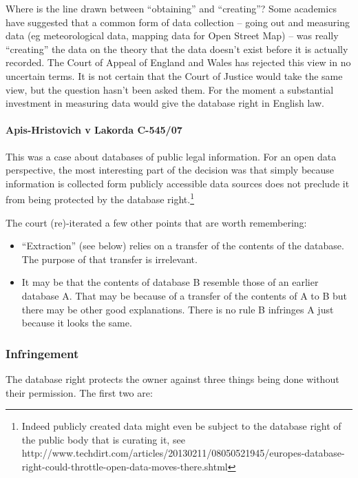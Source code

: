 Where is the line drawn between ``obtaining'' and ``creating''? Some
academics have suggested that a common form of data collection -- going
out and measuring data (eg meteorological data, mapping data for Open
Street Map) -- was really ``creating'' the data on the theory that the
data doesn't exist before it is actually recorded. The Court of Appeal
of England and Wales has rejected this view in no uncertain terms. It is
not certain that the Court of Justice would take the same view, but the
question hasn't been asked them. For the moment a substantial investment
in measuring data would give the database right in English law.

\paragraph{Apis-Hristovich v Lakorda
C-545/07}\label{apis-hristovich-v-lakorda-c-54507}

This was a case about databases of public legal information. For an open
data perspective, the most interesting part of the decision was that
simply because information is collected form publicly accessible data
sources does not preclude it from being protected by the database
right.\footnote{Indeed publicly created data might even be subject to
  the database right of the public body that is curating it, see
  http://www.techdirt.com/articles/20130211/08050521945/europes-database-right-could-throttle-open-data-moves-there.shtml}

The court (re)-iterated a few other points that are worth remembering:

\begin{itemize}
\item
  ``Extraction'' (see below) relies on a transfer of the contents of the
  database. The purpose of that transfer is irrelevant.
\item
  It may be that the contents of database B resemble those of an earlier
  database A. That may be because of a transfer of the contents of A to
  B but there may be other good explanations. There is no rule B
  infringes A just because it looks the same.
\end{itemize}

\subsubsection{Infringement}\label{infringement}

The database right protects the owner against three things being done
without their permission. The first two are:

